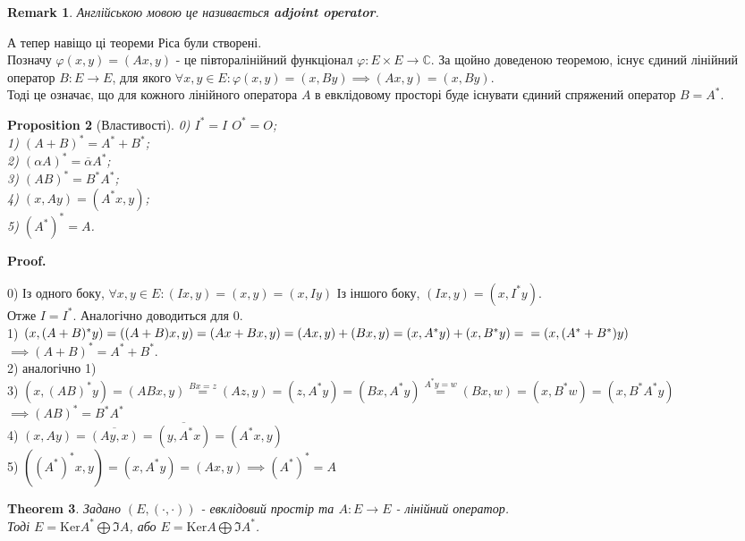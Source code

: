 \documentclass[a4paper, 10pt]{article}
\makeatletter
\def\qed{$\blacksquare$}
\def\ker#1{\textrm{Ker} {#1}}
\theoremstyle{theoremdd}
\newtheorem{theorem}{Theorem}[subsection]
\theoremstyle{theoremdd}
\theoremstyle{theoremdd}
\theoremstyle{theoremdd}
\theoremstyle{theoremdd}
\newtheorem{proposition}[theorem]{Proposition}
\theoremstyle{theoremdd}
\newtheorem{remark}[theorem]{Remark}
\theoremstyle{theoremdd}
\theoremstyle{theoremdd}
\renewenvironment{proof}[1][Proof.\\]{\par
\pushQED{\hfill \qed}%
\normalfont \topsep6\p@\@plus6\p@\relax
\trivlist
\item\relax
{\bfseries
#1\@addpunct{.}}\hspace\labelsep\ignorespaces
}{%
\popQED\endtrivlist\@endpefalse
}
\makeatother
\begin{document}
\begin{remark}
Англійською мовою це називається \textbf{adjoint operator}.
\end{remark}

А тепер навіщо ці теореми Ріса були створені.\\
Позначу $\varphi(x,y) = (Ax,y)$ - це півторалінійний функціонал $\varphi: E \times E \to \mathbb{C}$. За щойно доведеною теоремою, існує єдиний лінійний оператор $B: E \to E$, для якого $\forall x,y \in E: \varphi(x,y) = (x,By) \implies (Ax,y) = (x,By)$.\\
Тоді це означає, що для кожного лінійного оператора $A$ в евклідовому просторі буде існувати єдиний спряжений оператор $B = A^*$.

\begin{proposition}[Властивості]
0) $I^* = I$ \hspace{1cm} $O^* = O$;\\
1) $(A+B)^* = A^* + B^*$;\\
2) $(\alpha A)^* = \overline{\alpha} A^*$;\\
3) $(AB)^* = B^* A^*$;\\
4) $(x,Ay) = (A^*x,y)$;\\
5) $(A^*)^* = A$.
\end{proposition}

\begin{proof}
0) Із одного боку, $\forall x,y \in E: (Ix,y) = (x,y) = (x, Iy)$ Із іншого боку, $(Ix,y) = (x,I^*y)$.\\
Отже $I = I^*$. Аналогічно доводиться для $0$.
\bigskip \\
1) $(x,(A+B)^*y)=((A+B)x,y) = (Ax+Bx,y) = (Ax,y) + (Bx, y) = (x,A^* y)+(x,B^* y) = \\= (x,(A^*+B^*)y)$\\
$\implies (A+B)^* = A^* + B^*$.\\
2) аналогічно 1)
\bigskip \\
3) $(x,(AB)^*y)=(ABx, y) \overset{Bx = z}{=} (Az,y) = (z, A^*y) = (Bx, A^*y) \overset{A^* y = w}{=} (Bx,w) = (x, B^* w) = (x, B^* A^* y)$\\
$\implies (AB)^* = B^* A^*$
\bigskip \\
4) $(x,Ay) = \overline{(Ay, x)} = \overline{(y, A^*x)} = (A^*x, y)$
\bigskip \\
5) $((A^*)^*x,y)=(x,A^*y) = (Ax,y) 
\implies (A^*)^* = A$
\end{proof}

\begin{theorem}
Задано $(E,(\cdot,\cdot))$ - евклідовий простір та $A: E \to E$ - лінійний оператор.\\
Тоді $E = \ker A^* \bigoplus \Im A$, \hspace{2cm} або $E = \ker A \bigoplus \Im A^*$.
\end{theorem}
\end{document}
